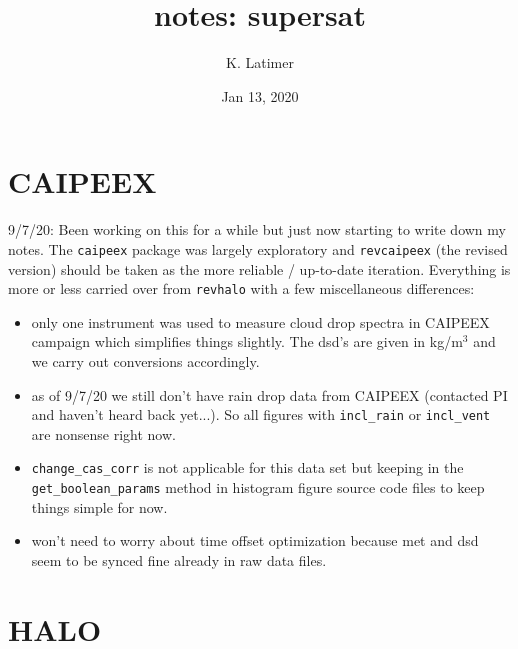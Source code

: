 \documentclass{article}
\title{notes: supersat}
\author{K. Latimer}
\date{Jan 13, 2020}
\begin{document}
\maketitle

\section{CAIPEEX}
9/7/20: Been working on this for a while but just now starting to write down my notes. The \texttt{caipeex} package was largely exploratory and \texttt{revcaipeex} (the revised version) should be taken as the more reliable / up-to-date iteration. Everything is more or less carried over from \texttt{revhalo} with a few miscellaneous differences:
\begin{itemize}
	\item only one instrument was used to measure cloud drop spectra in CAIPEEX campaign which simplifies things slightly. The dsd's are given in kg/m$^3$ and we carry out conversions accordingly.
	\item as of 9/7/20 we still don't have rain drop data from CAIPEEX (contacted PI and haven't heard back yet...). So all figures with \texttt{incl\_rain} or \texttt{incl\_vent} are nonsense right now.
	\item \texttt{change\_cas\_corr} is not applicable for this data set but keeping in the \texttt{get\_boolean\_params} method in histogram figure source code files to keep things simple for now.
	\item won't need to worry about time offset optimization because met and dsd seem to be synced fine already in raw data files.
\end{itemize}

\section{HALO}
\end{document}
